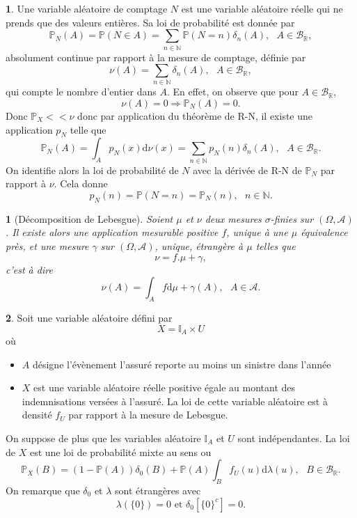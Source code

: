 \documentclass[8pt,notheorems]{beamer}
\def \N{\mathbb N}
\def \R{\mathbb{R}}
\def \P {\mathbb P}
\newtheorem{prop}{\translate{Proposition}}
\theoremstyle{definition}
\theoremstyle{example}
\newtheorem{example}{\translate{Exemple}}
\theoremstyle{mystyle}
\theoremstyle{plain}
\begin{document}
\begin{frame}[allowframebreaks]
\begin{example}
Une variable aléatoire de comptage $N$ est une variable aléatoire réelle qui ne prends que des valeurs entières. Sa loi de probabilité est donnée par 
$$
\P_N(A) = \P(N\in A) = \sum_{n\in \N}\P(N=n)\delta_n(A), \text{ }A\in \mathcal{B}_{\R},
$$
absolument continue par rapport à la mesure de comptage, définie par 
$$
\nu(A) = \sum_{n\in \N}\delta_n(A),\text{ }A\in \mathcal{B}_{\R},
$$
qui compte le nombre d'entier dans $A$. En effet, on observe que pour $A\in \mathcal{B}_{\R}$,
$$
\nu(A) = 0\Rightarrow \P_N(A) = 0.
$$
Donc $\P_X<<\nu$ donc par application du théorème de R-N, il existe une application $p_N$ telle que 
$$
\P_N(A) = \int_{A} p_N(x)\text{d}\nu(x) = \sum_{n\in \N}p_N(n)\delta_n(A),\text{ }A\in \mathcal{B}_{\R}.
$$
On identifie alors la loi de probabilité de $N$ avec la dérivée de R-N de $\P_N$ par rapport à $\nu$. Cela donne 
$$
p_N(n) = \P(N=n) = \P_N(n),\text{ }n\in \N.
$$ 
\end{example}
\end{frame}
\begin{frame}[allowframebreaks]
\begin{prop}[Décomposition de Lebesgue]
Soient $\mu$ et $\nu$ deux mesures $\sigma$-finies sur $(\Omega, \mathcal{A})$. Il existe alors une application mesurable positive $f$, unique à une $\mu$ équivalence près, et une mesure $\gamma$ sur $(\Omega, \mathcal{A})$, unique, étrangère à $\mu$ telles que 
$$
\nu = f.\mu + \gamma,
$$
c'est à dire 
$$
\nu(A) = \int_A f\text{d}\mu + \gamma(A), \text{ }A\in \mathcal{A}.
$$
\end{prop}
\begin{example}
Soit une variable aléatoire défini par 
$$
X = \mathbb{I}_A\times U
$$
où
\begin{itemize}
    \item $A$ désigne l'évènement l'assuré reporte au moins un sinistre dans l'année
    \item $X$ est une variable aléatoire réelle positive égale au montant des indemnisations versées à l'assuré. La loi de cette variable aléatoire est à densité $f_U$ par rapport à la mesure de Lebesgue. 
\end{itemize}
On suppose de plus que les variables aléatoire $\mathbb{I}_A$ et $U$ sont indépendantes. La loi de $X$ est une loi de probabilité mixte au sens ou 
$$
\P_X(B) = (1-\mathbb{P}(A))\delta_0(B) + \mathbb{P}(A)\int_B f_U(u)\text{d}\lambda(u),\text{ }B\in\mathcal{B}_\R.
$$
On remarque que $\delta_0$ et $\lambda$ sont étrangères avec 
$$
\lambda(\{0\}) = 0\text{ et }\delta_0\left[\{0\}^c\right]=0.
$$
\end{example}

\end{frame}
\end{document}
